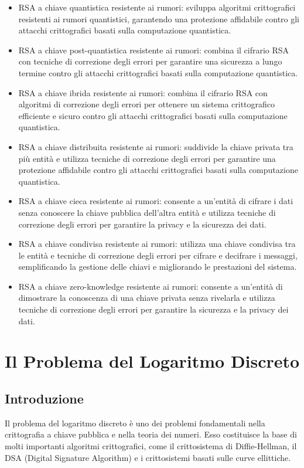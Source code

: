 \documentclass[a4paper,12pt]{report}
\begin{document}
\begin{itemize}
    \item RSA a chiave quantistica resistente ai rumori: sviluppa algoritmi crittografici resistenti ai rumori quantistici, garantendo una protezione affidabile contro gli attacchi crittografici basati sulla computazione quantistica.
    \item RSA a chiave post-quantistica resistente ai rumori: combina il cifrario RSA con tecniche di correzione degli errori per garantire una sicurezza a lungo termine contro gli attacchi crittografici basati sulla computazione quantistica.
    \item RSA a chiave ibrida resistente ai rumori: combina il cifrario RSA con algoritmi di correzione degli errori per ottenere un sistema crittografico efficiente e sicuro contro gli attacchi crittografici basati sulla computazione quantistica.
    \item RSA a chiave distribuita resistente ai rumori: suddivide la chiave privata tra più entità e utilizza tecniche di correzione degli errori per garantire una protezione affidabile contro gli attacchi crittografici basati sulla computazione quantistica.
    \item RSA a chiave cieca resistente ai rumori: consente a un'entità di cifrare i dati senza conoscere la chiave pubblica dell'altra entità e utilizza tecniche di correzione degli errori per garantire la privacy e la sicurezza dei dati.
    \item RSA a chiave condivisa resistente ai rumori: utilizza una chiave condivisa tra le entità e tecniche di correzione degli errori per cifrare e decifrare i messaggi, semplificando la gestione delle chiavi e migliorando le prestazioni del sistema.
    \item RSA a chiave zero-knowledge resistente ai rumori: consente a un'entità di dimostrare la conoscenza di una chiave privata senza rivelarla e utilizza tecniche di correzione degli errori per garantire la sicurezza e la privacy dei dati.
\end{itemize}
%
%
%
%
%
%
%
%
%
%
%
%
%
%
%
%
%
\chapter{Il Problema del Logaritmo Discreto}

\section{Introduzione}
Il problema del logaritmo discreto è uno dei problemi fondamentali nella crittografia a chiave pubblica e nella teoria dei numeri. Esso costituisce la base di molti importanti algoritmi crittografici, come il crittosistema di Diffie-Hellman, il DSA (Digital Signature Algorithm) e i crittosistemi basati sulle curve ellittiche.
\end{document}
